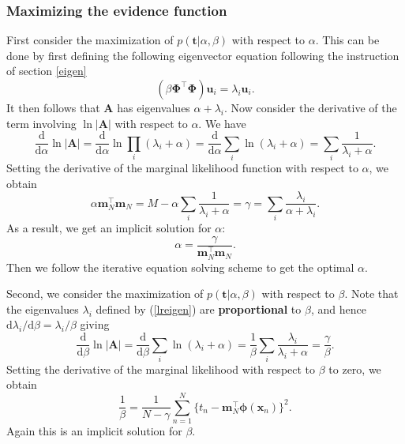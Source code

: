 \documentclass[a4paper]{report}
\newcommand{\ud}{\mathrm{d}}
\renewcommand{\bf}{\mathbf}
\newcommand{\bs}{\boldsymbol}
\begin{document}
\subsubsection{Maximizing the evidence function}\label{DEigens}
First consider the maximization of $p(\bf{t}|\alpha,\beta)$ with respect to $\alpha$. This can be done by first defining the following eigenvector equation following the instruction of section \ref{eigen}
\begin{equation}
(\beta \bs{\Phi}^{\intercal} \bs{\Phi})\bf{u}_i = \lambda_i \bf{u}_i. \label{lreigen}
\end{equation}
It then follows that $\bf{A}$ has eigenvalues $\alpha + \lambda_i$. Now consider the derivative of the term involving $\ln |\bf{A}|$ with respect to $\alpha$. We have
\begin{equation}
	\frac{\ud}{\ud \alpha}\ln |\bf{A}| = \frac{\ud}{\ud \alpha}\ln \prod_i(\lambda_i+\alpha)=\frac{\ud}{\ud \alpha}\sum_i \ln(\lambda_i+\alpha)=\sum_i \frac{1}{\lambda_i+\alpha}.
\end{equation}
Setting the derivative of the marginal likelihood function with respect to $\alpha$, we obtain
\begin{equation}
	\alpha \bf{m}_N^{\intercal} \bf{m}_N = M - \alpha \sum_i \frac{1}{\lambda_i+\alpha} = \gamma = \sum_i \frac{\lambda_i}{\alpha+\lambda_i}.
\end{equation}
As a result, we get an implicit solution for $\alpha$:
\begin{equation}
	\alpha = \frac{\gamma}{\bf{m}_N^{\intercal} \bf{m}_N}.
\end{equation}
Then we follow the iterative equation solving scheme to get the optimal $\alpha$.

Second, we consider the maximization of $p(\bf{t}|\alpha,\beta)$ with respect to $\beta$. Note that the eigenvalues $\lambda_i$ defined by (\ref{lreigen}) are \textbf{proportional} to $\beta$, and hence $\ud \lambda_i / \ud \beta = \lambda_i /\beta$ giving
\begin{equation}
	\frac{\ud}{\ud \beta} \ln |\bf{A}| = \frac{\ud}{\ud \beta}\sum_i \ln(\lambda_i+\alpha)=\frac{1}{\beta}\sum_i \frac{\lambda_i}{\lambda_i+\alpha} = \frac{\gamma}{\beta}.
\end{equation}
Setting the derivative of the marginal likelihood with respect to $\beta$ to zero, we obtain
\begin{equation}
	\frac{1}{\beta} = \frac{1}{N-\gamma} \sum_{n=1}^N \{ t_n - \bf{m}_N^{\intercal} \bs{\phi}(\bf{x}_n) \}^2.
\end{equation}
Again this is an implicit solution for $\beta$.
\end{document}
